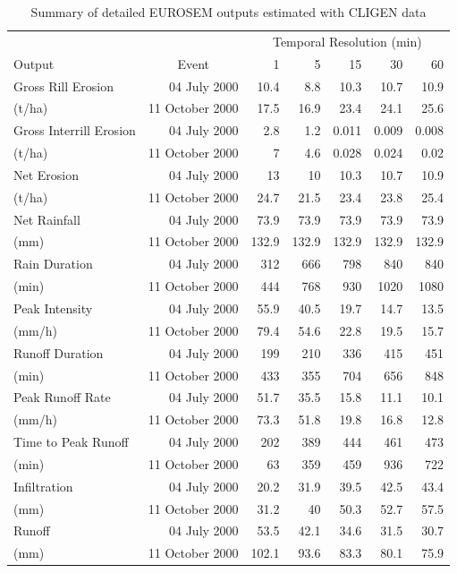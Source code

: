 \begin{table}[htbp]
\footnotesize
\caption{Summary of detailed EUROSEM outputs estimated with CLIGEN data}
\begin{center}
\begin{tabular}{lrrrrrr}
\toprule
\multicolumn{1}{l}{} & \multicolumn{1}{l}{} & \multicolumn{5}{c}{Temporal
Resolution (min)} \\ \cmidrule{3-7}
\multicolumn{1}{l}{Output} & \multicolumn{1}{c}{Event} & 1 & 5 & 15 & 30 & 60 \\
\midrule
Gross Rill Erosion & 04 July 2000 & 10.4 & 8.8 & 10.3 & 10.7 & 10.9 \\
(t/ha) & 11 October 2000 & 17.5 & 16.9 & 23.4 & 24.1 & 25.6 \\ \midrule
Gross Interrill Erosion & 04 July 2000 & 2.8 & 1.2 & 0.011 & 0.009 & 0.008 \\
(t/ha) & 11 October 2000 & 7 & 4.6 & 0.028 & 0.024 & 0.02 \\ \midrule
Net Erosion & 04 July 2000 & 13 & 10 & 10.3 & 10.7 & 10.9 \\
(t/ha) & 11 October 2000 & 24.7 & 21.5 & 23.4 & 23.8 & 25.4 \\ \midrule
Net Rainfall & 04 July 2000 & 73.9 & 73.9 & 73.9 & 73.9 & 73.9 \\
(mm) & 11 October 2000 & 132.9 & 132.9 & 132.9 & 132.9 & 132.9 \\ \midrule
Rain Duration & 04 July 2000 & 312 & 666 & 798 & 840 & 840 \\
(min) & 11 October 2000 & 444 & 768 & 930 & 1020 & 1080 \\ \midrule
Peak Intensity & 04 July 2000 & 55.9 & 40.5 & 19.7 & 14.7 & 13.5 \\
(mm/h) & 11 October 2000 & 79.4 & 54.6 & 22.8 & 19.5 & 15.7 \\ \midrule
Runoff Duration & 04 July 2000 & 199 & 210 & 336 & 415 & 451 \\
(min) & 11 October 2000 & 433 & 355 & 704 & 656 & 848 \\ \midrule
Peak Runoff Rate & 04 July 2000 & 51.7 & 35.5 & 15.8 & 11.1 & 10.1 \\
(mm/h) & 11 October 2000 & 73.3 & 51.8 & 19.8 & 16.8 & 12.8 \\ \midrule
Time to Peak Runoff & 04 July 2000 & 202 & 389 & 444 & 461 & 473 \\
(min) & 11 October 2000 & 63 & 359 & 459 & 936 & 722 \\ \midrule
Infiltration & 04 July 2000 & 20.2 & 31.9 & 39.5 & 42.5 & 43.4 \\
(mm) & 11 October 2000 & 31.2 & 40 & 50.3 & 52.7 & 57.5 \\ \midrule
Runoff & 04 July 2000 & 53.5 & 42.1 & 34.6 & 31.5 & 30.7 \\
(mm) & 11 October 2000 & 102.1 & 93.6 & 83.3 & 80.1 & 75.9 \\ \bottomrule
\end{tabular}
\end{center}
\label{tab:eurosemscaleresultdetails}
\end{table}

